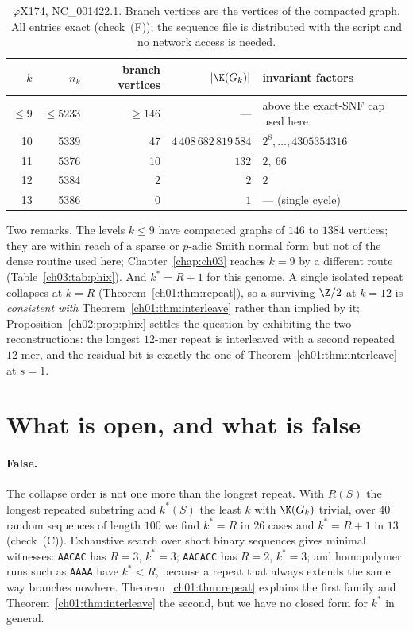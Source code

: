 \begin{table}[ht]
\centering\small
\begin{tabular}{rrrrl}
\toprule
$k$ & $n_k$ & branch vertices & $|\K(G_k)|$ & invariant factors\\
\midrule
$\le9$ & $\le5233$ & $\ge146$ & --- & above the exact-SNF cap used here\\
10 & 5339 & 47 & $4\,408\,682\,819\,584$ & $2^{8},\dots,4305354316$\\
11 & 5376 & 10 & $132$ & $2,\ 66$\\
12 & 5384 &  2 & $2$   & $2$\\
13 & 5386 &  0 & $1$   & --- (single cycle)\\
\bottomrule
\end{tabular}
\caption{$\varphi$X174, NC\_001422.1. Branch vertices are the vertices of the compacted
graph. All entries exact (check~(F)); the sequence file is distributed with the script and
no network access is needed.}
\label{ch01:tab:phix}
\end{table}

Two remarks. The levels $k\le9$ have compacted graphs of $146$ to $1384$ vertices; they are
within reach of a sparse or $p$-adic Smith normal form but not of the dense routine used
here; Chapter~\ref{chap:ch03} reaches $k=9$ by a different route (Table~\ref{ch03:tab:phix}). And $k^{*}=R+1$ for this genome. A single isolated repeat collapses at $k=R$
(Theorem~\ref{ch01:thm:repeat}), so a surviving $\Z/2$ at $k=12$ is \emph{consistent with}
Theorem~\ref{ch01:thm:interleave} rather than implied by it; Proposition~\ref{ch02:prop:phix}
settles the question by exhibiting the two reconstructions: the longest $12$-mer repeat is
interleaved with a second repeated $12$-mer, and the residual bit is exactly the one of
Theorem~\ref{ch01:thm:interleave} at $s=1$.

\section{What is open, and what is false}\label{ch01:sec:open}

\paragraph{False.} The collapse order is not one more than the longest repeat. With $R(S)$
the longest repeated substring and $k^{*}(S)$ the least $k$ with $\K(G_k)$ trivial, over
$40$ random sequences of length $100$ we find $k^{*}=R$ in $26$ cases and $k^{*}=R+1$ in
$13$ (check~(C)). Exhaustive search over short binary sequences gives minimal witnesses:
\texttt{AACAC} has $R=3$, $k^{*}=3$; \texttt{AACACC} has $R=2$, $k^{*}=3$; and homopolymer
runs such as \texttt{AAAA} have $k^{*}<R$, because a repeat that always extends the same
way branches nowhere. Theorem~\ref{ch01:thm:repeat} explains the first family and
Theorem~\ref{ch01:thm:interleave} the second, but we have no closed form for $k^{*}$ in general.

